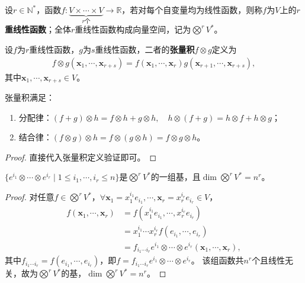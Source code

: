 \documentclass[../../main.tex]{subfiles}%
\begin{document}
\begin{definition}
设$r\in\mathbb{N}^*$，函数$f:\underbrace{V\times\cdots\times V}_{r\text{个}}\to\mathbb{R}$，若对每个自变量均为线性函数，则称$f$为$V$上的\textbf{$r$重线性函数}；全体$r$重线性函数构成向量空间，记为$\bigotimes^r V^*$。
\end{definition}

\begin{definition}
设$f$为$r$重线性函数，$g$为$s$重线性函数，二者的\textbf{张量积}$f\otimes g$定义为
\begin{align}
f\otimes g(\boldsymbol{x}_1,\cdots,\boldsymbol{x}_{r+s})=f(\boldsymbol{x}_1,\cdots,\boldsymbol{x}_r)g(\boldsymbol{x}_{r+1},\cdots,\boldsymbol{x}_{r+s}),
\label{eq:tensor_product}
\end{align}
其中$\boldsymbol{x}_1,\cdots,\boldsymbol{x}_{r+s}\in V$。
\end{definition}

\begin{proposition}
张量积满足：
\begin{enumerate}[(1)]
\item 分配律：$(f+g)\otimes h=f\otimes h+g\otimes h,\quad h\otimes(f+g)=h\otimes f+h\otimes g$；
\item 结合律：$(f\otimes g)\otimes h=f\otimes(g\otimes h)=f\otimes g\otimes h$。
\end{enumerate}
\end{proposition}
\begin{proof}

直接代入张量积定义验证即可。

\end{proof}

\begin{proposition}
$\{e^{i_1}\otimes\cdots\otimes e^{i_r}\mid 1\leq i_1,\cdots,i_r\leq n\}$是$\bigotimes^r V^*$的一组基，且$\dim\bigotimes^r V^*=n^r$。
\end{proposition}
\begin{proof}

对任意$f\in\bigotimes^r V^*$，$\forall\boldsymbol{x}_1=x_1^{i_1}e_{i_1},\cdots,\boldsymbol{x}_r=x_r^{i_r}e_{i_r}\in V$，
\begin{align*}
f(\boldsymbol{x}_1,\cdots,\boldsymbol{x}_r)&=f(x_1^{i_1}e_{i_1},\cdots,x_r^{i_r}e_{i_r})\\
&=x_1^{i_1}\cdots x_r^{i_r}f(e_{i_1},\cdots,e_{i_r})\\
&=f_{i_1\cdots i_r}e^{i_1}\otimes\cdots\otimes e^{i_r}(\boldsymbol{x}_1,\cdots,\boldsymbol{x}_r),
\end{align*}
其中$f_{i_1\cdots i_r}=f(e_{i_1},\cdots,e_{i_r})$，即$f=f_{i_1\cdots i_r}e^{i_1}\otimes\cdots\otimes e^{i_r}$。
该组函数共$n^r$个且线性无关，故为$\bigotimes^r V^*$的基，$\dim\bigotimes^r V^*=n^r$。

\end{proof}
\end{document}
